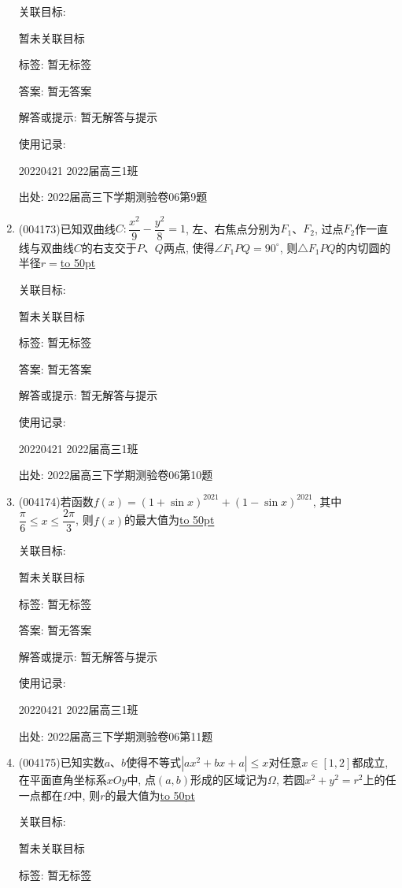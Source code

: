 \documentclass[10pt,a4paper]{article}
\newcommand{\blank}[1]{\underline{\hbox to #1pt{}}}
\begin{document}
\begin{enumerate}[1.]
关联目标:

暂未关联目标



标签: 暂无标签

答案: 暂无答案

解答或提示: 暂无解答与提示

使用记录:

20220421	2022届高三1班	


出处: 2022届高三下学期测验卷06第9题
\item { (004173)}已知双曲线$C:\dfrac{x^2}9-\dfrac{y^2}8=1$, 左、右焦点分别为$F_1$、$F_2$, 过点$F_2$作一直线与双曲线$C$的右支交于$P$、$Q$两点, 使得$\angle {F_1}PQ=90^\circ$, 则$\triangle {F_1}PQ$的内切圆的半径$r=$\blank{50}


关联目标:

暂未关联目标



标签: 暂无标签

答案: 暂无答案

解答或提示: 暂无解答与提示

使用记录:

20220421	2022届高三1班	


出处: 2022届高三下学期测验卷06第10题
\item { (004174)}若函数$f(x)={(1+\sin x)}^{2021}+{(1-\sin x)}^{2021}$, 其中$\dfrac{\pi }6\le x\le \dfrac{2\pi }3$, 则$f(x)$的最大值为\blank{50}


关联目标:

暂未关联目标



标签: 暂无标签

答案: 暂无答案

解答或提示: 暂无解答与提示

使用记录:

20220421	2022届高三1班	


出处: 2022届高三下学期测验卷06第11题
\item { (004175)}已知实数$a$、$b$使得不等式$|ax^2+bx+a|\le x$对任意$x\in [1,2]$都成立, 在平面直角坐标系$xOy$中, 点$(a,b)$形成的区域记为$\Omega$, 若圆$x^2+y^2=r^2$上的任一点都在$\Omega$中, 则$r$的最大值为\blank{50}


关联目标:

暂未关联目标



标签: 暂无标签


\end{enumerate}
\end{document}
